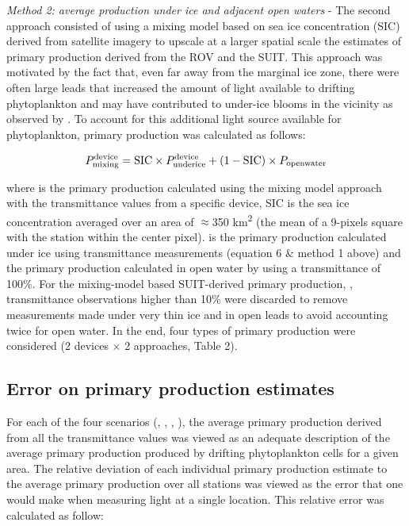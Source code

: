 \textit{Method 2: average production under ice and adjacent open waters} - The second approach consisted of using a mixing model based on sea ice concentration (SIC) derived from satellite imagery to upscale at a larger spatial scale the estimates of primary production derived from the ROV and the SUIT. This approach was motivated by the fact that, even far away from the marginal ice zone, there were often large leads that increased the amount of light available to drifting phytoplankton and may have contributed to under-ice blooms in the vicinity as observed by \citet{Assmy2017}. To account for this additional light source available for phytoplankton, primary production was calculated as follows:

\begin{linenomath*}
    \begin{equation}
		\ppmixingdevice{} = \text{SIC} \times \ppundericedevice{} + (1 - \text{SIC}) \times \ppopenwater{}
	\end{equation}
\end{linenomath*}

where \ppmixingdevice{} is the primary production calculated using the mixing model approach with the transmittance values from a specific device, SIC is the sea ice concentration averaged over an area of $\approx$350 km\textsuperscript{2} (the mean of a 9-pixels square with the station within the center pixel). \ppundericedevice{} is the primary production calculated under ice using transmittance measurements (equation 6 \& method 1 above) and \ppopenwater{} the primary production calculated in open water by using a transmittance of 100\%. For the mixing-model based SUIT-derived primary production, \ppmixingsuit{}, transmittance observations higher than 10\% were discarded to remove measurements made under very thin ice and in open leads to avoid accounting twice for open water. In the end, four types of primary production were considered (2 devices $\times$ 2 approaches, Table 2).

\subsection{Error on primary production estimates}

For each of the four scenarios (\ppmixingsuit{}, \ppmixingrov{}, \ppsuitunderice{}, \pprovunderice{}), the average primary production derived from all the transmittance values was viewed as an adequate description of the average primary production produced by drifting phytoplankton cells for a given area. The relative deviation of each individual primary production estimate to the average primary production over all stations was viewed as the error that one would make when measuring light at a single location. This relative error was calculated as follow:

